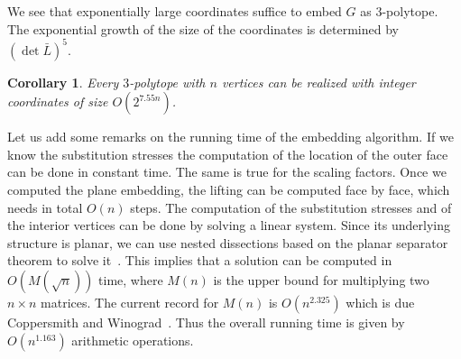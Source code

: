 \documentclass{article}
\theoremstyle{plain} \newtheorem{thm}{Theorem}[section]
\newtheorem{cor}{Corollary}[section]
\begin{document}
We see that exponentially large coordinates 
suffice to embed $G$ as $3$-polytope. The 
exponential growth of the size of the coordinates 
is determined by  $(\det \bar L)^5$.
\begin{cor}\label{cor:3d}
Every $3$-polytope  with $n$ vertices 
can be realized with integer coordinates of  size $O(2^{7.55n})$.
\end{cor}

Let us add some remarks on the running time of the embedding algorithm. If we know the substitution stresses the computation of the location of the outer face can be done in constant time. The same is true for the scaling factors. Once we computed the plane embedding, the lifting can be computed face by face, which needs in total $O(n)$ steps.
The computation of  the substitution stresses and of the interior vertices can be done by solving a linear system. Since its underlying structure is planar, we can use nested dissections   based on the planar separator theorem to solve it~\cite{lrt-gnd-79,lt-apst-80}. This implies that a solution can be computed in $O(M(\sqrt{n}))$ time, where $M(n)$ is the upper bound for multiplying two $n\times n$ matrices.  The current record for $M(n)$ is $O(n^{2.325})$ which is due Coppersmith and Winograd~\cite{cw-mmap-90}. Thus the overall running time is given by $O(n^{1.163})$ arithmetic operations.
\end{document}
